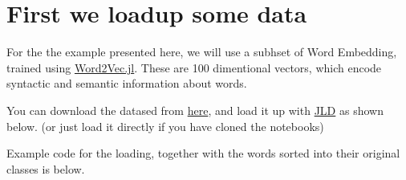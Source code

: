 \documentclass[11pt]{article}
\begin{document}
    \hypertarget{first-we-loadup-some-data}{%
\section{First we loadup some data}\label{first-we-loadup-some-data}}

For the the example presented here, we will use a subhset of Word
Embedding, trained using
\href{https://github.com/tanmaykm/Word2Vec.jl}{Word2Vec.jl}. These are
100 dimentional vectors, which encode syntactic and semantic information
about words.

You can download the datased from
\href{http://ucidatascienceinitiative.github.io/IntroToJulia/Html/ForwardDiff}{here},
and load it up with \href{https://github.com/JuliaIO/JLD.jl}{JLD} as
shown below. (or just load it directly if you have cloned the notebooks)

Example code for the loading, together with the words sorted into their
original classes is below.
\end{document}
